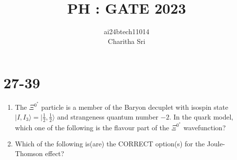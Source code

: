 \documentclass[journal,12pt,onecolumn]{IEEEtran}
\theoremstyle{remark}
\begin{document}

\vspace{3cm}

\title{PH : GATE 2023}
\author{ai24btech11014 \\ Charitha Sri}

\maketitle
\bigskip       
\renewcommand{\thefigure}{\theenumi}
\renewcommand{\thetable}{\theenumi}

\section{27-39}
\begin{enumerate}

\item The $\Xi^{0^{*}}$ particle is a member of the Baryon decuplet with isospin state $|I, I_{3}\rangle = | \frac{1}{2}, \frac{1}{2} \rangle$ and strangeness quantum number $-2$. In the quark model, which one of the following is the flavour part of the $\Xi^{0^{*}}$ wavefunction?
\begin{enumerate}
\end{enumerate}

\item Which of the following is(are) the CORRECT option(s) for the Joule-Thomson effect?
\begin{enumerate}
\end{enumerate}



\end{enumerate}
\end{document}

